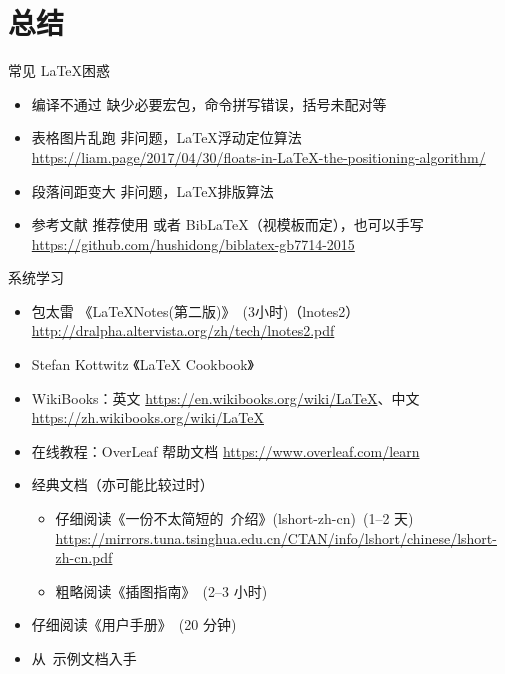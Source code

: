 
\section{总结}

\begin{frame}{常见 \LaTeX 困惑}
  \begin{itemize}
    \item \alert{编译不通过} 缺少必要宏包，命令拼写错误，括号未配对等
    \item \alert{表格图片乱跑} 非问题，\LaTeX 浮动定位算法 \url{https://liam.page/2017/04/30/floats-in-LaTeX-the-positioning-algorithm/}
    \item \alert{段落间距变大} 非问题，\LaTeX 排版算法
    \item \alert{参考文献} 推荐使用 \BibTeX 或者 Bib\LaTeX（视模板而定），也可以手写  \url{https://github.com/hushidong/biblatex-gb7714-2015}
  \end{itemize}
\end{frame}

\begin{frame}{系统学习}
  \begin{itemize}
      \item 包太雷 《\LaTeX Notes(第二版)》~(3小时)（lnotes2） \url{http://dralpha.altervista.org/zh/tech/lnotes2.pdf}
      \item Stefan Kottwitz 《LaTeX Cookbook》
      \item WikiBooks：英文 \url{https://en.wikibooks.org/wiki/LaTeX}、中文 \url{https://zh.wikibooks.org/wiki/LaTeX}
      \item 在线教程：OverLeaf 帮助文档 \url{https://www.overleaf.com/learn}
      \item 经典文档（亦可能比较过时）
        \begin{itemize}
          \item 仔细阅读《一份不太简短的~\LaTeXe 介绍》(lshort-zh-cn)~(1--2 天)
            \url{https://mirrors.tuna.tsinghua.edu.cn/CTAN/info/lshort/chinese/lshort-zh-cn.pdf}
          \item 粗略阅读《\LaTeXe 插图指南》~(2--3 小时)
        \end{itemize}
      \item 仔细阅读《\ThuThesis 用户手册》~(20 分钟)
      \item 从~\ThuThesis 示例文档入手
  \end{itemize}
\end{frame}

